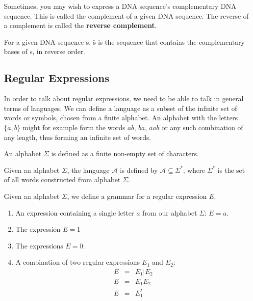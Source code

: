 \documentclass[12pt]{article}
\theoremstyle{definition}
\begin{document}
Sometimes, you may wish to express a DNA sequence's complementary DNA sequence. This is called the complement of a given DNA sequence. The reverse of a complement is called the \textbf{reverse complement}.

\begin{definition}
For a given DNA sequence s, \~{s} is the sequence that contains the complementary bases of s, in reverse order.
\end{definition}

\subsection{Regular Expressions}

In order to talk about regular expressions, we need to be able to talk in general terms of languages. We can define a language as a subset of the infinite set of words or symbols, chosen from a finite alphabet. An alphabet with the letters $\{a,b\}$ might for example form the words $ab$, $ba$, $aab$ or any such combination of any length, thus forming an infinite set of words.\\

\begin{definition} An alphabet $\Sigma$ is defined as a finite non-empty set of characters.

\end{definition}

\begin{definition} Given an alphabet $\Sigma$, the language $\mathcal{A}$ is defined by $\mathcal{A} \subseteq \Sigma^*$, where $\Sigma^*$ is the set of all words constructed from alphabet $\Sigma$.
	
\end{definition} 

\begin{definition} Given an alphabet $\Sigma$, we define a grammar for a regular expression $E$.\\

	\begin{enumerate}
		\item An expression containing a single letter $a$ from our alphabet $\Sigma$: $E = a$. 
		\item The expression $E = 1$
		\item The expressions $E = 0$.
		\item A combination of two regular expressions $E_1$ and $E_2$:
		\begin{eqnarray}
			E &=& E_1 | E_2 \\
			E &=& E_1E_2 \\
			E &=& E_1^*
		\end{eqnarray}
	\end{enumerate}	
\end{definition} 
\end{document}
